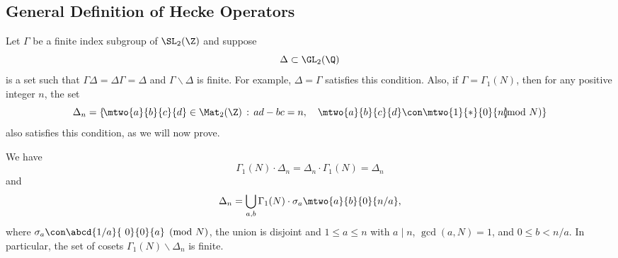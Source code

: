 \subsection{General Definition of Hecke Operators}\label{sec:gendefn}
Let $\Gamma$ be a finite index subgroup of $\SL_2(\Z)$ and suppose
$$
  \Delta\subset \GL_2(\Q)
$$
is a set such that $\Gamma\Delta = \Delta\Gamma = \Delta$ 
and $\Gamma \backslash \Delta$
is finite.  For example, $\Delta=\Gamma$
satisfies this condition.  Also,
if $\Gamma=\Gamma_1(N)$, then for any positive integer $n$, the set 
$$
  \Delta_n = \left\{
\!\mtwo{a}{b}{c}{d}\in \Mat_2(\Z) \,:\, ad-bc=n, \quad
\mtwo{a}{b}{c}{d}\con \mtwo{1}{*}{0}{n}\!\!\!\!\!\!\pmod{N}
   \right\}
$$
also satisfies this condition, as we will now prove.
\begin{lemma}\label{lem:deltan}
We have 
$$
  \Gamma_1(N)\cdot \Delta_n = \Delta_n \cdot \Gamma_1(N) = \Delta_n
$$
and
$$
 \Delta_n = \bigcup_{a,b} \Gamma_1(N) \cdot \sigma_a \mtwo{a}{b}{0}{n/a},
$$
where $\sigma_a \con \abcd{\hfill 1/a}{\,\, 0}{0}{ \hfill a}\pmod{N}$,
the union is disjoint and $1\leq a \leq n$ with $a\mid n$, $\gcd(a,N)=1$,
and $0\leq b < n/a$.  In particular, the set of cosets
$\Gamma_1(N)\backslash \Delta_n$ is finite.
\end{lemma}
